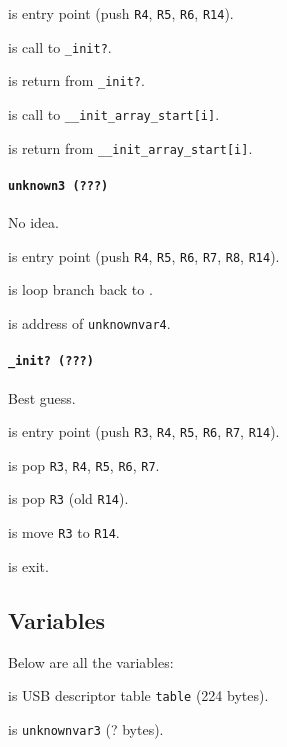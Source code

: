  is entry point (push \texttt{R4}, \texttt{R5},
\texttt{R6}, \texttt{R14}).

 is call to \texttt{\_init?}.

 is return from \texttt{\_init?}.

 is call to \texttt{\_\_init\_array\_start[i]}.

 is return from \texttt{\_\_init\_array\_start[i]}.

\paragraph{\texttt{unknown3 (???)}} No idea.

 is entry point (push \texttt{R4}, \texttt{R5},
\texttt{R6}, \texttt{R7}, \texttt{R8}, \texttt{R14}).

 is loop branch back to .

 is address of \texttt{unknownvar4}.

\paragraph{\texttt{\_init? (???)}} Best guess.

 is entry point (push \texttt{R3}, \texttt{R4},
\texttt{R5}, \texttt{R6}, \texttt{R7}, \texttt{R14}).

 is pop \texttt{R3}, \texttt{R4}, \texttt{R5},
\texttt{R6}, \texttt{R7}.

 is pop \texttt{R3} (old \texttt{R14}).

 is move \texttt{R3} to \texttt{R14}.

 is exit.

\subsection{Variables}

Below are all the variables:

\vspace{1em}

 is USB descriptor table \texttt{table} (224 bytes).

 is \texttt{unknownvar3} (? bytes).

